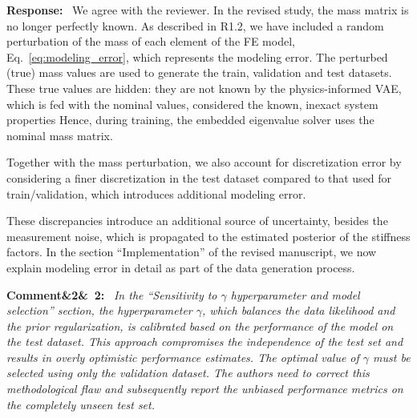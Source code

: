 \documentclass[11pt]{article}
\newenvironment{rcomment}[1]{\par\bigskip\noindent\textbf{Comment\ifx&#1&\else\ #1\fi:}\ \itshape}{\par}
\newenvironment{response}{\par\smallskip\noindent\color{resp}\textbf{Response:}\ }{\par}
\begin{document}
\begin{response}
We agree with the reviewer. In the revised study, the mass matrix is no longer perfectly known.
As described in R1.2, we have included a random perturbation of the mass of each element of the FE model, Eq.~\eqref{eq:modeling_error}, which represents the modeling error.
The perturbed (true) mass values are used to generate the train, validation and test datasets.
These true values are hidden: they are not known by the physics-informed VAE, which is fed with the nominal values, considered the known, inexact system properties 
Hence, during training, the embedded eigenvalue solver uses the nominal mass matrix. 

Together with the mass perturbation, we also account for discretization error by considering a finer discretization in the test dataset compared to that used for train/validation, which introduces additional modeling error. 

These discrepancies introduce an additional source of uncertainty, besides the measurement noise, which is propagated to the estimated posterior of the stiffness factors.
In the section ``Implementation'' of the revised manuscript, we now explain modeling error in detail as part of the data generation process. 

\end{response}



\begin{rcomment}{2}
In the ``Sensitivity to $\gamma$ hyperparameter and model selection'' section, the hyperparameter $\gamma$, which
balances the data likelihood and the prior regularization, is calibrated based on the performance of the model on the
test dataset. This approach compromises the independence of the test set and results in overly optimistic performance
estimates. The optimal value of $\gamma$ must be selected using only the validation dataset. The authors need to
correct this methodological flaw and subsequently report the unbiased performance metrics on the completely unseen test
set.
\end{rcomment}
\end{document}
